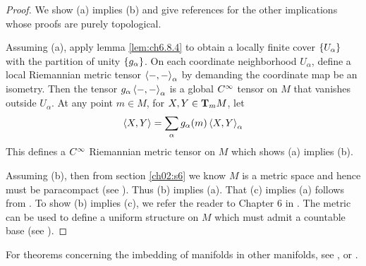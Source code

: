 \documentclass[../main]{subfiles}
\begin{document}
\begin{proof}
We show (a) implies (b) and give references for the other implications whose proofs are purely topological.

Assuming (a), apply lemma \ref{lem:ch6.8.4} to obtain a locally finite cover $\brc{U_\alpha}$ with the partition of unity $\brc{g_\alpha}$. On each coordinate neighborhood $U_\alpha$, define a local Riemannian metric tensor $\ip{-}{-}_\alpha$ by demanding the coordinate map be an isometry. Then the tensor $g_\alpha\ip{-}{-}_\alpha$ is a global $\CInfty$ tensor on $M$ that vanishes outside $U_\alpha$. At any point $m\in M$, for $X,Y\in\ts Mm$, let
\[\ip{X}{Y}=\sum_\alpha g_\alpha(m)\ip{X}{Y}_\alpha\]
This defines a $\CInfty$ Riemannian metric tensor on $M$ which shows (a) implies (b).

Assuming (b), then from section \ref{ch02:s6} we know $M$ is a metric space and hence must be paracompact (see \cite[p. 160]{kelley2017general}). Thus (b) implies (a). That (c) implies (a) follows from \cite[p .79]{hocking2012topology}. To show (b) implies (c), we refer the reader to Chapter 6 in \cite{kelley2017general}. The metric can be used to define a uniform structure on $M$ which must admit a countable base (see \cite[p. 186]{kelley2017general}).
\end{proof}



For theorems concerning the imbedding of manifolds in other manifolds, see \cite{sternberg1964lectures}, \cite{auslander2012introduction} or \cite{Smale1961DifferentiableAC}.
\end{document}
